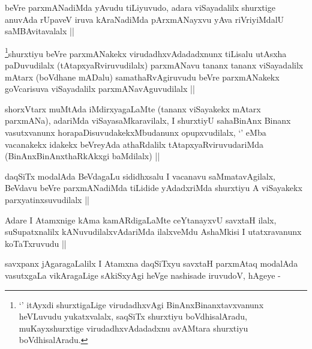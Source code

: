 \begin{artha}
beVre parxmANadiMda yAvudu tiLiyuvudo, adara viSayadalilx shurxtige
anuvAda rUpaveV iruva kAraNadiMda pArxmANayxvu yAva riVriyiMdalU
saMBAvitavalalx ||
\end{artha}


\begin{artha}
\footnote[1]{`\stext' itAyxdi shurxtigaLige virudadhxvAgi
  BinAnxBinanxtavxvanunx heVLuvudu yukatxvalalx, saqSiTx shurxtiyu
  boVdhisalAradu, muKayxshurxtige virudadhxvAdadadxnu avAMtara
  shurxtiyu boVdhisalAradu.}shurxtiyu beVre parxmANakekx virudadhxvAdadadxnunx
tiLisalu utAsxha paDuvudilalx (tAtapxyaRviruvudilalx) parxmANavu
tananx tananx viSayadalilx mAtarx (boVdhane mADalu) samathaRvAgiruvudu
beVre parxmANakekx goVcarisuva viSayadalilx parxmANavAguvudilalx ||
\end{artha}


\begin{artha}
shorxVtarx muMtAda iMdirxyagaLaMte (tananx viSayakekx mAtarx
parxmANa), adariMda viSayasaMkaravilalx, I shurxtiyU sahaBinAnx Binanx
vasutxvanunx horapaDisuvudakekxMbudanunx opupxvudilalx, `\stext' eMba
vacanakekx idakekx beVreyAda athaRdalilx tAtapxyaRviruvudariMda
(BinAnxBinAnxthaRkAkxgi baMdilalx) ||
\end{artha}

\begin{artha}
daqSiTx modalAda BeVdagaLu sididhxsalu I vacanavu saMmatavAgilalx,
BeVdavu beVre parxmANadiMda tiLidide yAdadxriMda shurxtiyu A
viSayakekx parxyatinxsuvudilalx ||
\end{artha}

\begin{artha}
Adare I Atamxnige kAma kamARdigaLaMte ceYtanayxvU savxtaH ilalx,
suSupatxnalilx kANuvudilalxvAdariMda ilalxveMdu AshaMkisi I
utatxravanunx koTaTxruvudu ||
\end{artha}


\begin{artha}
savxpanx jAgaragaLalilx I Atamxna daqSiTxyu savxtaH parxmAtaq modalAda
vasutxgaLa vikAragaLige sAkiSxyAgi heVge nashisade iruvudoV, hAgeye -
\end{artha}

